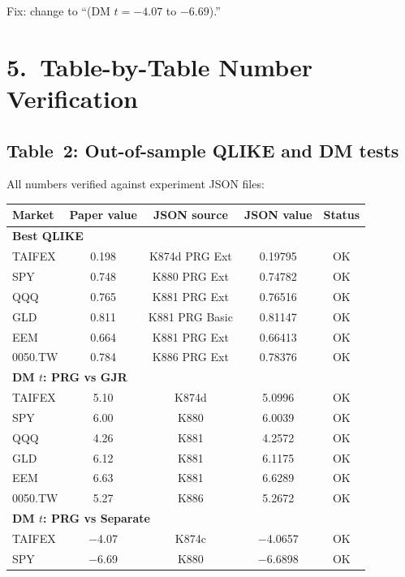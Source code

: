 \documentclass[12pt,a4paper]{article}
\begin{document}
Fix: change to ``(DM $t = -4.07$ to $-6.69$).''


\section*{5.\ Table-by-Table Number Verification}

\subsection*{Table~2: Out-of-sample QLIKE and DM tests}

All numbers verified against experiment JSON files:

\begin{longtable}{lcccc}
\toprule
Market & Paper value & JSON source & JSON value & Status \\
\midrule
\endhead
\multicolumn{5}{l}{\textbf{Best QLIKE}} \\
TAIFEX & 0.198 & K874d PRG Ext & 0.19795 & \textcolor{okgreen}{OK} \\
SPY & 0.748 & K880 PRG Ext & 0.74782 & \textcolor{okgreen}{OK} \\
QQQ & 0.765 & K881 PRG Ext & 0.76516 & \textcolor{okgreen}{OK} \\
GLD & 0.811 & K881 PRG Basic & 0.81147 & \textcolor{okgreen}{OK} \\
EEM & 0.664 & K881 PRG Ext & 0.66413 & \textcolor{okgreen}{OK} \\
0050.TW & 0.784 & K886 PRG Ext & 0.78376 & \textcolor{okgreen}{OK} \\
\midrule
\multicolumn{5}{l}{\textbf{DM $t$: PRG vs GJR}} \\
TAIFEX & 5.10 & K874d & 5.0996 & \textcolor{okgreen}{OK} \\
SPY & 6.00 & K880 & 6.0039 & \textcolor{okgreen}{OK} \\
QQQ & 4.26 & K881 & 4.2572 & \textcolor{okgreen}{OK} \\
GLD & 6.12 & K881 & 6.1175 & \textcolor{okgreen}{OK} \\
EEM & 6.63 & K881 & 6.6289 & \textcolor{okgreen}{OK} \\
0050.TW & 5.27 & K886 & 5.2672 & \textcolor{okgreen}{OK} \\
\midrule
\multicolumn{5}{l}{\textbf{DM $t$: PRG vs Separate}} \\
TAIFEX & $-$4.07 & K874c & $-$4.0657 & \textcolor{okgreen}{OK} \\
SPY & $-$6.69 & K880 & $-$6.6898 & \textcolor{okgreen}{OK} \\

\end{longtable}
\end{document}

